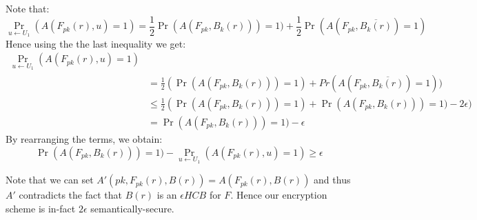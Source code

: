 \documentclass{article}
\begin{document}
Note that:
\[\Pr_{u \leftarrow U_1}(A(F_{pk}(r), u) =1) = \frac{1}{2}\Pr(A(F_{pk}, B_k(r)) ) = 1)  + \frac{1}{2}\Pr(A(F_{pk}, \overline{B_k(r)}) = 1)\]
Hence using the the last inequality we get:
\begin{align*}
\Pr_{u \leftarrow U_1}(A(F_{pk}(r), u) =1) &\\
&= \frac{1}{2}(\Pr(A(F_{pk}, B_k(r)) ) = 1)  + Pr(A(F_{pk}, \overline{B_k(r)}) = 1))\\
 &\leq\frac{1}{2}(\Pr(A(F_{pk}, B_k(r)) ) = 1) + \Pr(A(F_{pk}, B_k(r)) ) = 1) - 2\epsilon ) \\
 &= \Pr(A(F_{pk}, B_k(r)) ) = 1) - \epsilon
\end{align*}
By rearranging the terms, we obtain:
 \[\Pr(A(F_{pk}, B_k(r)) ) = 1) - \Pr_{u \leftarrow U_1}(A(F_{pk}(r), u) =1) \geq \epsilon\]

Note that we can set $A'(pk, F_{pk}(r), B(r)) = A(F_{pk}(r), B(r)) $ and thus $A'$ contradicts the fact that $B(r)$ is an $\epsilon HCB$ for $F$.
Hence our encryption scheme is in-fact $2\epsilon$ semantically-secure.
\end{document}
